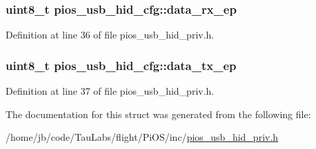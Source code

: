 \hypertarget{structpios__usb__hid__cfg_a9e2b92a09aa1fefba09f5668d00e2ef7}{
\subsubsection[{data\-\_\-rx\-\_\-ep}]{\setlength{\rightskip}{0pt plus 5cm}uint8\-\_\-t {\bf pios\-\_\-usb\-\_\-hid\-\_\-cfg\-::data\-\_\-rx\-\_\-ep}}}\label{structpios__usb__hid__cfg_a9e2b92a09aa1fefba09f5668d00e2ef7}


\-Definition at line 36 of file pios\-\_\-usb\-\_\-hid\-\_\-priv.\-h.

\hypertarget{structpios__usb__hid__cfg_a700e6e6591adae231e06b05411cb321b}{
\subsubsection[{data\-\_\-tx\-\_\-ep}]{\setlength{\rightskip}{0pt plus 5cm}uint8\-\_\-t {\bf pios\-\_\-usb\-\_\-hid\-\_\-cfg\-::data\-\_\-tx\-\_\-ep}}}\label{structpios__usb__hid__cfg_a700e6e6591adae231e06b05411cb321b}


\-Definition at line 37 of file pios\-\_\-usb\-\_\-hid\-\_\-priv.\-h.



\-The documentation for this struct was generated from the following file\-:\begin{DoxyCompactItemize}
\item 
/home/jb/code/\-Tau\-Labs/flight/\-Pi\-O\-S/inc/\hyperlink{pios__usb__hid__priv_8h}{pios\-\_\-usb\-\_\-hid\-\_\-priv.\-h}\end{DoxyCompactItemize}
